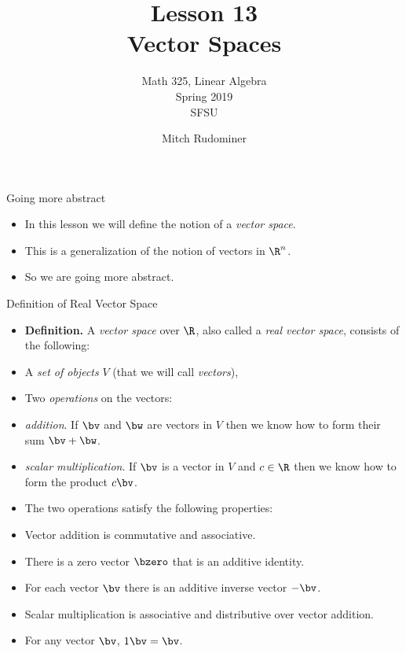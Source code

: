 \documentclass{beamer}
\title{Lesson 13 \\ Vector Spaces}
\subtitle{Math 325, Linear Algebra \\Spring 2019 \\ SFSU}
\author{Mitch Rudominer}
\date{}
\begin{document}
\begin{frame}
  \titlepage
\end{frame}

\begin{frame}{Going more abstract}

\begin{itemize}
\item In this lesson we will define the notion of a \emph{vector space}.
\item This is a generalization of the notion of vectors in $\R^n$.
\item So we are going  more abstract.
\end{itemize}
\end{frame}

\begin{frame}{Definition of Real Vector Space}

\begin{itemize}
\item \textbf{Definition.} A \emph{vector space} over $\R$, also called
a \emph{real vector space}, consists of the following:
\item A \emph{set of objects} $V$ (that we will call \emph{vectors}),
\item Two \emph{operations} on the vectors:
\item \emph{addition}. If $\bv$ and $\bw$ are vectors in $V$ then
we know how to form their sum $\bv+\bw$.
\item \emph{scalar multiplication}. If $\bv$ is a vector in $V$ and
$c\in\R$ then we know how to form the product $c\bv$.
\item The two operations satisfy the following properties:
\item Vector addition is commutative and associative.
\item There is a zero vector $\bzero$ that is an additive identity.
\item For each vector $\bv$ there is an additive inverse vector $-\bv$.
\item Scalar multiplication is associative and distributive over vector addition.
\item For any vector $\bv$, $1\bv = \bv$.
\end{itemize}
\end{frame}
\end{document}
